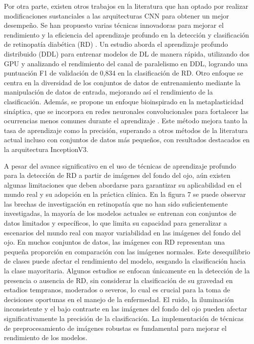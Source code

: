 Por otra parte, existen otros trabajos en la literatura que han optado por realizar
modificaciones sustanciales a las arquitecturas CNN para obtener un mejor desempeño. Se
han propuesto varias técnicas innovadoras para mejorar el rendimiento y la eficiencia del
aprendizaje profundo en la detección y clasificación de retinopatía diabética (RD)
. Un estudio aborda el aprendizaje profundo distribuido (DDL)
para entrenar modelos de DL de manera rápida, utilizando dos GPU y analizando el
rendimiento del canal de paralelismo en DDL, logrando una puntuación F1 de validación de
0,834 en la clasificación de RD. Otro enfoque se centra en la diversidad de los conjuntos
de datos de entrenamiento mediante la manipulación de datos de entrada, mejorando así el
rendimiento de la clasificación. Además, se propone un
enfoque bioinspirado en la metaplasticidad sináptica, que se incorpora en redes neuronales
convolucionales para fortalecer las ocurrencias menos comunes durante el aprendizaje
. Este método mejora tanto la tasa de aprendizaje como la
precisión, superando a otros métodos de la literatura actual incluso con conjuntos de
datos más pequeños, con resultados destacados en la arquitectura InceptionV3.



A pesar del avance significativo en el uso de técnicas de aprendizaje profundo para la
detección de RD a partir de imágenes del fondo del ojo, aún existen algunas limitaciones
que deben abordarse para garantizar su aplicabilidad en el mundo real y su adopción en la
práctica clínica. En la figura 7 se puede observar las brechas de investigación en
retinopatía que no han sido suficientemente investigadas, la mayoría de los modelos
actuales se entrenan con conjuntos de datos limitados y específicos, lo que limita su
capacidad para generalizar a escenarios del mundo real con mayor variabilidad en las
imágenes del fondo del ojo. En muchos conjuntos de datos, las imágenes con RD representan
una pequeña proporción en comparación con las imágenes normales. Este desequilibrio de
clases puede afectar el rendimiento del modelo, sesgando la clasificación hacia la clase
mayoritaria. Algunos estudios se enfocan únicamente en la detección de la presencia o
ausencia de RD, sin considerar la clasificación de su gravedad en estadios tempranos,
moderados o severos, lo cual es crucial para la toma de decisiones oportunas en el manejo
de la enfermedad. El ruido, la iluminación inconsistente y el bajo contraste en las
imágenes del fondo del ojo pueden afectar significativamente la precisión de la
clasificación. La implementación de técnicas de preprocesamiento de imágenes robustas es
fundamental para mejorar el rendimiento de los modelos.


